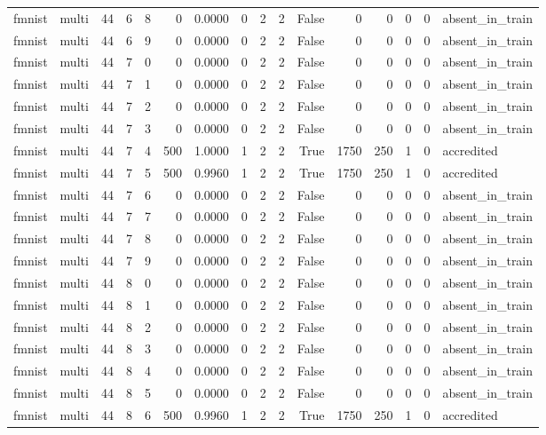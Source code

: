 \begin{tabular}{llrrrrrrrrrrrrrl}
fmnist & multi & 44 & 6 & 8 & 0 & 0.0000 & 0 & 2 & 2 & False & 0 & 0 & 0 & 0 & absent\_in\_train \\
fmnist & multi & 44 & 6 & 9 & 0 & 0.0000 & 0 & 2 & 2 & False & 0 & 0 & 0 & 0 & absent\_in\_train \\
fmnist & multi & 44 & 7 & 0 & 0 & 0.0000 & 0 & 2 & 2 & False & 0 & 0 & 0 & 0 & absent\_in\_train \\
fmnist & multi & 44 & 7 & 1 & 0 & 0.0000 & 0 & 2 & 2 & False & 0 & 0 & 0 & 0 & absent\_in\_train \\
fmnist & multi & 44 & 7 & 2 & 0 & 0.0000 & 0 & 2 & 2 & False & 0 & 0 & 0 & 0 & absent\_in\_train \\
fmnist & multi & 44 & 7 & 3 & 0 & 0.0000 & 0 & 2 & 2 & False & 0 & 0 & 0 & 0 & absent\_in\_train \\
fmnist & multi & 44 & 7 & 4 & 500 & 1.0000 & 1 & 2 & 2 & True & 1750 & 250 & 1 & 0 & accredited \\
fmnist & multi & 44 & 7 & 5 & 500 & 0.9960 & 1 & 2 & 2 & True & 1750 & 250 & 1 & 0 & accredited \\
fmnist & multi & 44 & 7 & 6 & 0 & 0.0000 & 0 & 2 & 2 & False & 0 & 0 & 0 & 0 & absent\_in\_train \\
fmnist & multi & 44 & 7 & 7 & 0 & 0.0000 & 0 & 2 & 2 & False & 0 & 0 & 0 & 0 & absent\_in\_train \\
fmnist & multi & 44 & 7 & 8 & 0 & 0.0000 & 0 & 2 & 2 & False & 0 & 0 & 0 & 0 & absent\_in\_train \\
fmnist & multi & 44 & 7 & 9 & 0 & 0.0000 & 0 & 2 & 2 & False & 0 & 0 & 0 & 0 & absent\_in\_train \\
fmnist & multi & 44 & 8 & 0 & 0 & 0.0000 & 0 & 2 & 2 & False & 0 & 0 & 0 & 0 & absent\_in\_train \\
fmnist & multi & 44 & 8 & 1 & 0 & 0.0000 & 0 & 2 & 2 & False & 0 & 0 & 0 & 0 & absent\_in\_train \\
fmnist & multi & 44 & 8 & 2 & 0 & 0.0000 & 0 & 2 & 2 & False & 0 & 0 & 0 & 0 & absent\_in\_train \\
fmnist & multi & 44 & 8 & 3 & 0 & 0.0000 & 0 & 2 & 2 & False & 0 & 0 & 0 & 0 & absent\_in\_train \\
fmnist & multi & 44 & 8 & 4 & 0 & 0.0000 & 0 & 2 & 2 & False & 0 & 0 & 0 & 0 & absent\_in\_train \\
fmnist & multi & 44 & 8 & 5 & 0 & 0.0000 & 0 & 2 & 2 & False & 0 & 0 & 0 & 0 & absent\_in\_train \\
fmnist & multi & 44 & 8 & 6 & 500 & 0.9960 & 1 & 2 & 2 & True & 1750 & 250 & 1 & 0 & accredited \\

\end{tabular}
